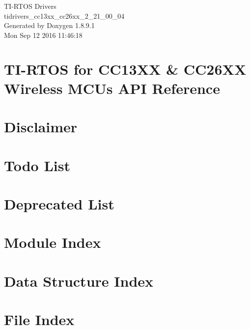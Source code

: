 \documentclass[twoside]{article}
\newcommand{\+}{\discretionary{\mbox{\scriptsize$\hookleftarrow$}}{}{}}
\begin{document}
\begin{titlepage}
\vspace*{7cm}
\begin{center}%
{\Large T\+I-\/\+R\+T\+O\+S Drivers \\[1ex]\large tidrivers\+\_\+cc13xx\+\_\+cc26xx\+\_\+2\+\_\+21\+\_\+00\+\_\+04 }\\
\vspace*{1cm}
{\large Generated by Doxygen 1.8.9.1}\\
\vspace*{0.5cm}
{\small Mon Sep 12 2016 11:46:18}\\
\end{center}
\end{titlepage}
\tableofcontents
{}

\section{T\+I-\/\+R\+T\+O\+S for C\+C13\+X\+X \& C\+C26\+X\+X Wireless M\+C\+Us A\+P\+I Reference}
\label{index}\hypertarget{index}{}
\section{Disclaimer}
\label{_disclaimer}

\section{Todo List}
\label{todo}

\section{Deprecated List}
\label{deprecated}

\section{Module Index}

\section{Data Structure Index}

\section{File Index}

\end{document}
